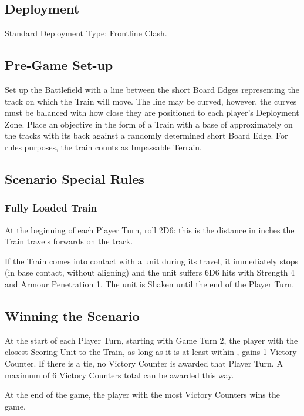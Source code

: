 
\label{RunawayTrain}


\subsection*{Deployment}

Standard Deployment Type: Frontline Clash.


\subsection*{Pre-Game Set-up}

Set up the Battlefield with a line between the short Board Edges representing the track on which the Train will move. The line may be curved, however, the curves must be balanced with how close they are positioned to each player's Deployment Zone. Place an objective in the form of a Train with a base of approximately  on the tracks with its back against a randomly determined short Board Edge. For rules purposes, the train counts as Impassable Terrain.

\subsection*{Scenario Special Rules}

\subsubsection*{Fully Loaded Train}

At the beginning of each Player Turn, roll 2D6: this is the distance in inches the Train travels forwards on the track.

If the Train comes into contact with a unit during its travel, it immediately stops (in base contact, without aligning) and the unit suffers 6D6 hits with Strength 4 and Armour Penetration 1. The unit is Shaken until the end of the Player Turn.

\subsection*{Winning the Scenario}

At the start of each Player Turn, starting with Game Turn 2, the player with the closest Scoring Unit to the Train, as long as it is at least within , gains 1 Victory Counter. If there is a tie, no Victory Counter is awarded that Player Turn. A maximum of 6 Victory Counters total can be awarded this way.

At the end of the game, the player with the most Victory Counters wins the game.

